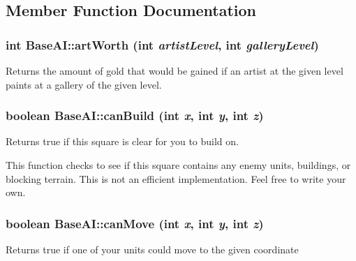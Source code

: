 \subsection{Member Function Documentation}
\hypertarget{classBaseAI_9a6e10da16c3b209915251ca183815e7}{
\subsubsection[{artWorth}]{\setlength{\rightskip}{0pt plus 5cm}int BaseAI::artWorth (int {\em artistLevel}, \/  int {\em galleryLevel})}}
\label{classBaseAI_9a6e10da16c3b209915251ca183815e7}


Returns the amount of gold that would be gained if an artist at the given level paints at a gallery of the given level. \hypertarget{classBaseAI_fcd72f9782c984b69f60db45756d73c4}{
\subsubsection[{canBuild}]{\setlength{\rightskip}{0pt plus 5cm}boolean BaseAI::canBuild (int {\em x}, \/  int {\em y}, \/  int {\em z})}}
\label{classBaseAI_fcd72f9782c984b69f60db45756d73c4}


Returns true if this square is clear for you to build on.

This function checks to see if this square contains any enemy units, buildings, or blocking terrain. This is not an efficient implementation. Feel free to write your own. \hypertarget{classBaseAI_2c7a4223bdc14056161c650c218369b3}{
\subsubsection[{canMove}]{\setlength{\rightskip}{0pt plus 5cm}boolean BaseAI::canMove (int {\em x}, \/  int {\em y}, \/  int {\em z})}}
\label{classBaseAI_2c7a4223bdc14056161c650c218369b3}


Returns true if one of your units could move to the given coordinate

